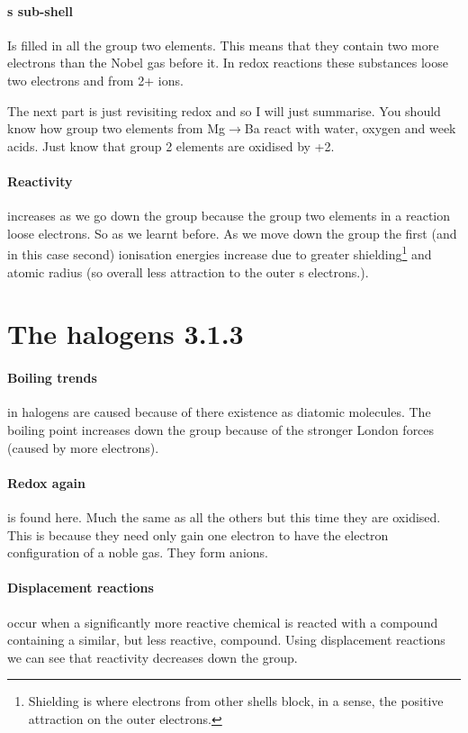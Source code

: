 	\paragraph{s sub-shell} Is filled in all the group two elements. This means that they contain two more electrons than the Nobel gas before it. In redox reactions these substances loose two electrons and from 2+ ions.
	
	The next part is just revisiting redox and so I will just summarise. You should know how group two elements from Mg$\rightarrow$Ba react with water, oxygen and week acids. Just know that group 2 elements are oxidised by +2.
	
	\paragraph{Reactivity} increases as we go down the group because the group two elements in a reaction loose electrons. So as we learnt before. As we move down the group the first (and in this case second) ionisation energies increase due to greater shielding\footnote{Shielding is where electrons from other shells block, in a sense, the positive attraction on the outer electrons.} and atomic radius (so overall less attraction to the outer s electrons.).
	
\section{The halogens 3.1.3}
	
	\paragraph{Boiling trends} in halogens are caused because of there existence as diatomic molecules. The boiling point increases down the group because of the stronger London forces (caused by more electrons).
	
	\paragraph{Redox again} is found here. Much the same as all the others but this time they are oxidised. This is because they need only gain one electron to have the electron configuration of a noble gas. They form anions.
	
	\paragraph{Displacement reactions} occur when a significantly more reactive chemical is reacted with a compound containing a similar, but less reactive, compound. Using displacement reactions we can see that reactivity decreases down the group.
	
